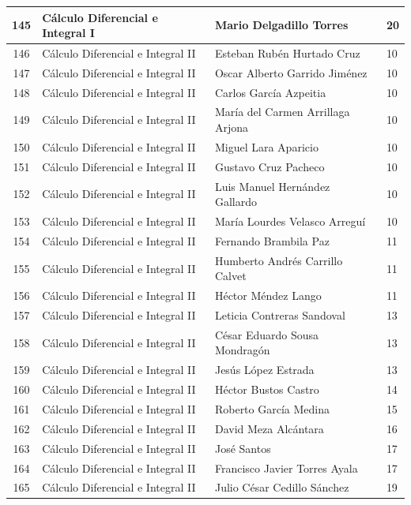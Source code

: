 {\begin{longtable}{|c|p{6.5cm}|p{5cm}|p{1.5cm}|}
  145 & Cálculo Diferencial e Integral I & Mario Delgadillo Torres & 20 \\ \hline
  146 & Cálculo Diferencial e Integral II & Esteban Rubén Hurtado Cruz & 10 \\ \hline
  147 & Cálculo Diferencial e Integral II & Oscar Alberto Garrido Jiménez & 10 \\ \hline
  148 & Cálculo Diferencial e Integral II & Carlos García Azpeitia & 10 \\ \hline
  149 & Cálculo Diferencial e Integral II & María del Carmen Arrillaga Arjona & 10 \\ \hline
  150 & Cálculo Diferencial e Integral II & Miguel Lara Aparicio & 10 \\ \hline
  151 & Cálculo Diferencial e Integral II & Gustavo Cruz Pacheco & 10 \\ \hline
  152 & Cálculo Diferencial e Integral II & Luis Manuel Hernández Gallardo & 10 \\ \hline
  153 & Cálculo Diferencial e Integral II & María Lourdes Velasco Arreguí & 10 \\ \hline
  154 & Cálculo Diferencial e Integral II & Fernando Brambila Paz & 11 \\ \hline
  155 & Cálculo Diferencial e Integral II & Humberto Andrés Carrillo Calvet & 11 \\ \hline
  156 & Cálculo Diferencial e Integral II & Héctor Méndez Lango & 11 \\ \hline
  157 & Cálculo Diferencial e Integral II & Leticia Contreras Sandoval & 13 \\ \hline
  158 & Cálculo Diferencial e Integral II & César Eduardo Sousa Mondragón & 13 \\ \hline
  159 & Cálculo Diferencial e Integral II & Jesús López Estrada & 13 \\ \hline
  160 & Cálculo Diferencial e Integral II & Héctor Bustos Castro & 14 \\ \hline
  161 & Cálculo Diferencial e Integral II & Roberto García Medina & 15 \\ \hline
  162 & Cálculo Diferencial e Integral II & David Meza Alcántara & 16 \\ \hline
  163 & Cálculo Diferencial e Integral II & José Santos & 17 \\ \hline
  164 & Cálculo Diferencial e Integral II & Francisco Javier Torres Ayala & 17 \\ \hline
  165 & Cálculo Diferencial e Integral II & Julio César Cedillo Sánchez & 19 \\ \hline

\end{longtable}}
